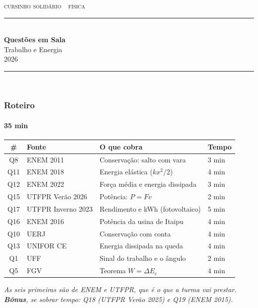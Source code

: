 \documentclass[aspectratio=169,12pt]{beamer}
\begin{document}

\begin{frame}[plain]
\vspace{0.6cm}
{\scshape\color{vinho}cursinho solid\'ario \,\textperiodcentered\, f\'isica}\\[-0.5em]
{\color{vinho}\rule{\textwidth}{1.6pt}}\\[1.0em]
{\huge\bfseries Quest\~oes em Sala}\\[0.45em]
{\LARGE Trabalho e Energia}\\[1.0em]
\hfill {\color{grafite}2026}\\[-0.3em]
{\color{black!30}\rule{\textwidth}{0.5pt}}\\[0.8em]
\end{frame}

\begin{frame}
\frametitle{Roteiro}
\framesubtitle{35 min}

\footnotesize
{\renewcommand{\arraystretch}{1.10}
\begin{tabular}{@{}clll@{}}
  \textbf{\#} & \textbf{Fonte} & \textbf{O que cobra} & \textbf{Tempo}\\[0.15em]
  \hline
  \rule{0pt}{1.15em}%
  Q8  & ENEM 2011          & Conserva\c{c}\~ao: salto com vara            & 3 min \\
  Q11 & ENEM 2018          & Energia el\'astica ($kx^2/2$)                & 4 min \\
  Q12 & ENEM 2022          & For\c{c}a m\'edia e energia dissipada        & 3 min \\
  Q15 & UTFPR Ver\~ao 2026 & Pot\^encia: $P = Fv$                         & 2 min \\
  Q17 & UTFPR Inverno 2023 & Rendimento e kWh (fotovoltaico)              & 5 min \\
  Q16 & ENEM 2016          & Pot\^encia da usina de Itaipu                & 4 min \\[0.35em]
  Q10 & UERJ               & Conserva\c{c}\~ao com conta                  & 4 min \\
  Q13 & UNIFOR CE          & Energia dissipada na queda                   & 4 min \\
  Q1  & UFF                & Sinal do trabalho e o \^angulo               & 2 min \\
  Q5  & FGV                & Teorema $W = \Delta E_c$                     & 4 min \\
\end{tabular}}

\vspace{0.5em}
{\footnotesize\color{grafite}\itshape
As seis primeiras s\~ao de ENEM e UTFPR, que \'e o que a turma vai
prestar. \textbf{B\^onus}, se sobrar tempo: Q18 (UTFPR Ver\~ao 2025) e
Q19 (ENEM 2015).}

\end{frame}
\end{document}
